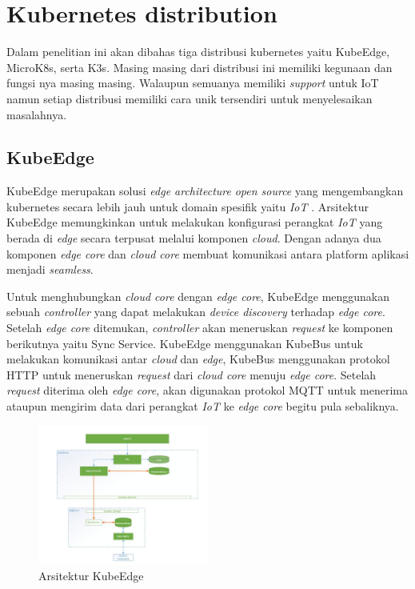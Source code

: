 \section{Kubernetes distribution}
Dalam penelitian ini akan dibahas tiga distribusi kubernetes yaitu KubeEdge, MicroK8s, serta K3s. Masing masing dari distribusi ini memiliki kegunaan dan fungsi nya masing masing. Walaupun semuanya memiliki \textit{support} untuk IoT namun setiap distribusi memiliki cara unik tersendiri untuk menyelesaikan masalahnya.

\subsection{KubeEdge}
KubeEdge merupakan solusi \textit{edge architecture} \textit{open source} yang mengembangkan kubernetes secara lebih jauh untuk domain spesifik yaitu \textit{IoT} \parencite{kubeedge}. Arsitektur KubeEdge memungkinkan untuk melakukan konfigurasi perangkat \textit{IoT} yang berada di \textit{edge} secara terpusat melalui komponen \textit{cloud}. Dengan adanya dua komponen \textit{edge core} dan \textit{cloud core} membuat komunikasi antara platform aplikasi menjadi \textit{seamless}.

Untuk menghubungkan \textit{cloud core} dengan \textit{edge core}, KubeEdge menggunakan sebuah \textit{controller} yang dapat melakukan \textit{device discovery} terhadap \textit{edge core}. Setelah \textit{edge core} ditemukan, \textit{controller} akan meneruskan \textit{request} ke komponen berikutnya yaitu Sync Service. KubeEdge menggunakan KubeBus untuk melakukan komunikasi antar \textit{cloud} dan \textit{edge}, KubeBus menggunakan protokol HTTP untuk meneruskan \textit{request} dari \textit{cloud core} menuju \textit{edge core}. Setelah \textit{request} diterima oleh \textit{edge core}, akan digunakan protokol MQTT untuk menerima ataupun mengirim data dari perangkat \textit{IoT} ke \textit{edge core} begitu pula sebaliknya.

\begin{figure}[h]
  \centering
  \includegraphics[width=0.5\textwidth]{resources/chapter-2/arsitektur-kube-edge.jpg}
  \caption{Arsitektur KubeEdge \parencite{kubeedge}}
  \label{fig:arsitektur-kube-edge}
\end{figure}

